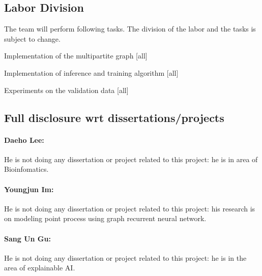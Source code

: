 \subsection{Labor Division}

The team will perform following tasks. The division of the labor and the tasks is subject to change.
\bit
\item Implementation of the multipartite graph [all]
\item Implementation of inference and training algorithm [all]
\item Experiments on the validation data [all]
\eit

\subsection{Full disclosure wrt dissertations/projects}

\paragraph{Daeho Lee:}
He is not doing any dissertation or project related to this project: he is in area of Bioinfomatics.

\paragraph{Youngjun Im:}
He is not doing any dissertation or project related to this project: his research is on modeling point process using graph recurrent neural network.

\paragraph{Sang Un Gu:}
He is not doing any dissertation or project related to this project: he is in the area of explainable AI.
